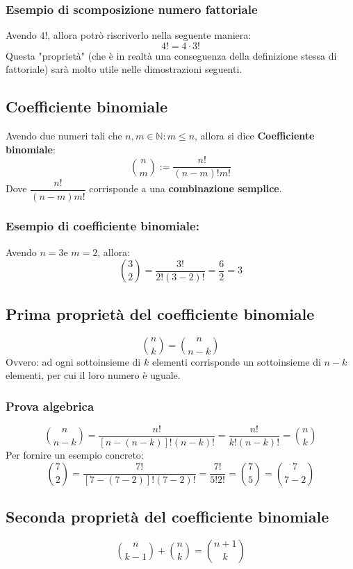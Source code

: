 \documentclass[12pt]{article}
\begin{document}
\subsubsection{Esempio di scomposizione numero fattoriale}
Avendo $4!$, allora potrò riscriverlo nella seguente maniera:
\[
    4! = 4 \cdot 3!
\]
Questa "proprietà" (che è in realtà una conseguenza della definizione stessa di fattoriale) sarà molto utile nelle dimostrazioni seguenti.
\subsection{Coefficiente binomiale}
Avendo due numeri tali che $n, m \in \mathbb{N} : m \leq n$, allora si dice \textbf{Coefficiente binomiale}:
\begin{equation}
    \binom{n}{m} := \dfrac{n!}{(n-m)!m!} \label{eq:coefficiente_binomiale}
\end{equation}
Dove $\dfrac{n!}{(n-m)m!}$ corrisponde a una \textbf{combinazione semplice}.
\subsubsection{Esempio di coefficiente binomiale:}
Avendo $n=3 \text{e } m=2$, allora:
\[
    \binom{3}{2} = \dfrac{3!}{2!(3-2)!} = \dfrac{6}{2} = 3
\]
\subsection{Prima proprietà del coefficiente binomiale}
\begin{equation}
    \binom{n}{k} = \binom{n}{n-k} \label{prop1_coeff_binomiale}
\end{equation}
Ovvero: ad ogni sottoinsieme di $k$ elementi corrisponde un sottoinsieme di $n-k$ elementi, per cui il loro numero è uguale.
\subsubsection{Prova algebrica}
\[
    \binom{n}{n-k} = \dfrac{n!}{[n-(n-k)]!(n-k)!} = \dfrac{n!}{k!(n-k)!} = \binom{n}{k}
\]
Per fornire un esempio concreto:
\[
    \binom{7}{2} = \dfrac{7!}{[7 - (7 - 2)]!(7-2)!} = \dfrac{7!}{5!2!} = \binom{7}{5} = \binom{7}{7-2}
\]
\subsection{Seconda proprietà del coefficiente binomiale}
\begin{equation}
    \binom{n}{k-1} + \binom{n}{k} = \binom{n+1}{k} \label{prop2_coeff_binomiale}
\end{equation}
\end{document}
